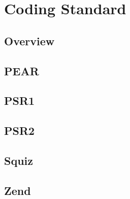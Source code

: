 \part{Coding Standard}


\chapter{Overview}



\chapter{PEAR}




\chapter{PSR1}




\chapter{PSR2}



\chapter{Squiz}



\chapter{Zend}
